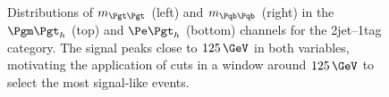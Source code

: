 \begin{figure}
\begin{center}

\end{center}
\caption[Distributions of $m_{\Pgt\Pgt}$ (left) and $m_{\Pqb\Pqb}$ (right) in the $\mutau$ (top) and
$\etau$ (bottom) channels for the 2jet--1tag category.]{
Distributions of $m_{\Pgt\Pgt}$ (left) and $m_{\Pqb\Pqb}$ (right) in the $\mutau$ (top) and
$\etau$ (bottom) channels for the 2jet--1tag category. The signal peaks close to
$125\,\GeV$ in both variables, motivating the application of cuts in a window
around $125\,\GeV$ to select the most signal-like events.}
\label{fig:2jet1tagmttmbb}
\end{figure} 

